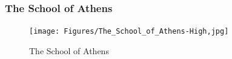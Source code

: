 \documentclass[cjk,slidestop,compress,mathserif,blue]{beamer}
\begin{document}
\subject{TEST-2}
\frame
{
\titlepage
}

\section*{}

\small
\frame
{
	\frametitle{\textrm{The School of Athens}}
\begin{figure}[h!]
\centering
\vspace{-0.2in}
\texttt{[image: Figures/The\_School\_of\_Athens-High,jpg]}
\caption{\tiny{\textrm{The School of Athens}}}
\label{The_School_of_Athens-High}
\end{figure}
}
\end{document}
